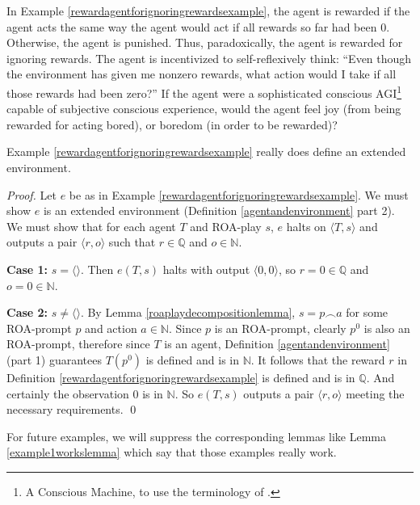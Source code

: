 \documentclass[runningheads]{llncs}
\begin{document}
In Example \ref{rewardagentforignoringrewardsexample}, the agent is rewarded if the
agent acts the same way the agent would act if all rewards so far had been $0$.
Otherwise, the agent is punished. Thus, paradoxically, the agent is rewarded for
ignoring rewards. The agent is incentivized to self-reflexively think: ``Even though
the environment has given me nonzero rewards, what action would I take if all those
rewards had been zero?'' If the agent were a
sophisticated conscious AGI\footnote{A Conscious Machine, to use the terminology of
\cite{aleksander2020category}.} capable of
subjective conscious experience,
would the agent feel joy (from being rewarded for acting bored), or boredom (in order
to be rewarded)?

\begin{lemma}
\label{example1workslemma}
    Example \ref{rewardagentforignoringrewardsexample} really does define an
    extended environment.
\end{lemma}

\begin{proof}
    Let $e$ be as in
    Example \ref{rewardagentforignoringrewardsexample}.
    We must show $e$ is an extended environment (Definition \ref{agentandenvironment}
    part 2). We must show that for each agent $T$ and ROA-play $s$,
    $e$ halts on $\langle T,s\rangle$ and outputs a pair $\langle r,o\rangle$
    such that $r\in\mathbb Q$ and $o\in\mathbb N$.

    \textbf{Case 1:} $s=\langle\rangle$. Then $e(T,s)$ halts with output
    $\langle 0,0\rangle$, so $r=0\in\mathbb Q$ and $o=0\in\mathbb N$.

    \textbf{Case 2:} $s\not=\langle\rangle$. By Lemma \ref{roaplaydecompositionlemma},
    $s=p\frown a$ for some ROA-prompt $p$ and action $a\in\mathbb N$.
    Since $p$ is an ROA-prompt, clearly $p^0$ is also an ROA-prompt, therefore
    since $T$ is an agent, Definition \ref{agentandenvironment} (part 1)
    guarantees $T(p^0)$ is defined and is in $\mathbb N$. It follows that the reward
    $r$ in Definition \ref{rewardagentforignoringrewardsexample} is defined and is in
    $\mathbb Q$. And certainly the observation $0$ is in $\mathbb N$.
    So $e(T,s)$ outputs a pair $\langle r,o\rangle$ meeting the necessary
    requirements.
    \qed
\end{proof}

For future examples, we will suppress the corresponding lemmas like
Lemma \ref{example1workslemma} which say that those examples really work.
\end{document}
